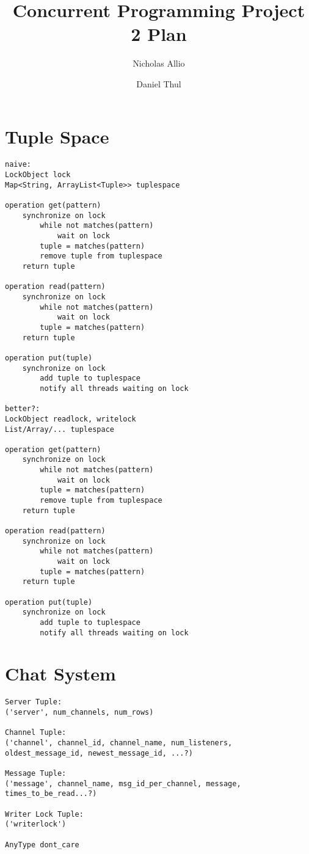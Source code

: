 \documentclass[10pt,a4paper]{article}
\author{Nicholas Allio \and Daniel Thul}
\title{Concurrent Programming Project 2 Plan}
\begin{document}
\maketitle

\section{Tuple Space}



\begin{verbatim}
naive:
LockObject lock
Map<String, ArrayList<Tuple>> tuplespace

operation get(pattern)
	synchronize on lock
		while not matches(pattern)
			wait on lock
		tuple = matches(pattern)
		remove tuple from tuplespace
	return tuple

operation read(pattern)
	synchronize on lock
		while not matches(pattern)
			wait on lock
		tuple = matches(pattern)
	return tuple

operation put(tuple)
	synchronize on lock
		add tuple to tuplespace
		notify all threads waiting on lock

better?:
LockObject readlock, writelock
List/Array/... tuplespace

operation get(pattern)
	synchronize on lock
		while not matches(pattern)
			wait on lock
		tuple = matches(pattern)
		remove tuple from tuplespace
	return tuple

operation read(pattern)
	synchronize on lock
		while not matches(pattern)
			wait on lock
		tuple = matches(pattern)
	return tuple

operation put(tuple)
	synchronize on lock
		add tuple to tuplespace
		notify all threads waiting on lock
\end{verbatim}

\section{Chat System}

\begin{verbatim}
Server Tuple:
('server', num_channels, num_rows)

Channel Tuple:
('channel', channel_id, channel_name, num_listeners, oldest_message_id, newest_message_id, ...?)

Message Tuple:
('message', channel_name, msg_id_per_channel, message, times_to_be_read...?)

Writer Lock Tuple:
('writerlock')

AnyType dont_care

\end{verbatim}
\end{document}
